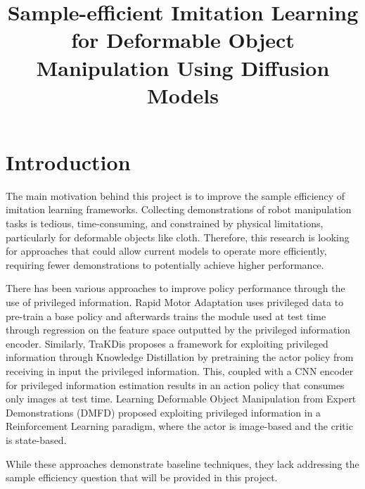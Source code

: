 \documentclass{article}
\title{Sample-efficient Imitation Learning for Deformable Object Manipulation Using Diffusion Models}
\begin{document}
\maketitle

\section*{Introduction}
The main motivation behind this project is to improve the sample efficiency of imitation learning frameworks.
Collecting demonstrations of robot manipulation tasks is tedious, time-consuming, and constrained by physical limitations, particularly for deformable objects like cloth.
Therefore, this research is looking for approaches that could allow current models to operate more efficiently, requiring fewer demonstrations to potentially achieve higher performance.

 There has been various approaches to improve policy performance through the use of privileged information.
Rapid Motor Adaptation \cite{kumar2021rma} uses privileged data to pre-train a base policy and afterwards trains the module used at test time through regression on the feature space outputted by the privileged information encoder.
Similarly, TraKDis \cite{chen2024trakdis} proposes a framework for exploiting privileged information through Knowledge Distillation by pretraining the actor policy from receiving in input the privileged information.
This, coupled with a CNN encoder for privileged information estimation results in an action policy that consumes only images at test time.
Learning Deformable Object Manipulation from Expert Demonstrations (DMFD) \cite{salhotra2022learning} proposed exploiting privileged information in a Reinforcement Learning paradigm, where the actor is image-based and the critic is state-based.

While these approaches demonstrate baseline techniques, they lack addressing the sample efficiency question that will be provided in this project.

\end{document}
